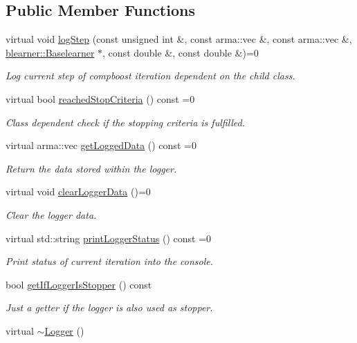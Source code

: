 \subsection*{Public Member Functions}
\begin{DoxyCompactItemize}
\item 
virtual void \hyperlink{classlogger_1_1_logger_a91d987a86698e455b6fd3468f266d3fe}{log\+Step} (const unsigned int \&, const arma\+::vec \&, const arma\+::vec \&, \hyperlink{classblearner_1_1_baselearner}{blearner\+::\+Baselearner} $\ast$, const double \&, const double \&)=0
\begin{DoxyCompactList}\small\item\em Log current step of compboost iteration dependent on the child class. \end{DoxyCompactList}\item 
virtual bool \hyperlink{classlogger_1_1_logger_aed91421c07062b91cee158ef2bda7ae8}{reached\+Stop\+Criteria} () const =0
\begin{DoxyCompactList}\small\item\em Class dependent check if the stopping criteria is fulfilled. \end{DoxyCompactList}\item 
virtual arma\+::vec \hyperlink{classlogger_1_1_logger_aa4fc254c532172db3404b7c0bcd17092}{get\+Logged\+Data} () const =0
\begin{DoxyCompactList}\small\item\em Return the data stored within the logger. \end{DoxyCompactList}\item 
virtual void \hyperlink{classlogger_1_1_logger_a8c68db2430fa84b67528bfa6ae45a516}{clear\+Logger\+Data} ()=0
\begin{DoxyCompactList}\small\item\em Clear the logger data. \end{DoxyCompactList}\item 
virtual std\+::string \hyperlink{classlogger_1_1_logger_abad818a7e8053ca84cb267e883b5e377}{print\+Logger\+Status} () const =0
\begin{DoxyCompactList}\small\item\em Print status of current iteration into the console. \end{DoxyCompactList}\item 
bool \hyperlink{classlogger_1_1_logger_ae39cfa15ba833840ae52889c09cac994}{get\+If\+Logger\+Is\+Stopper} () const
\begin{DoxyCompactList}\small\item\em Just a getter if the logger is also used as stopper. \end{DoxyCompactList}\item 
virtual \hyperlink{classlogger_1_1_logger_aa85a309d218f9f006600cbaf2a348f52}{$\sim$\+Logger} ()
\end{DoxyCompactItemize}
